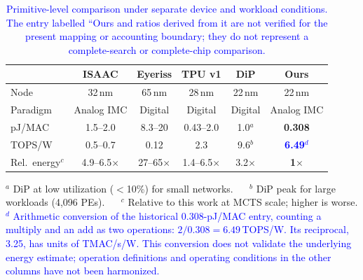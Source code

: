\begin{table}[t]
\centering
\caption{\textcolor{blue}{Primitive-level comparison under separate device and workload conditions. The entry labelled ``Ours\textquotesingle\textquotesingle{} and ratios derived from it are not verified for the present mapping or accounting boundary; they do not represent a complete-search or complete-chip comparison.}}
\label{tab:supp_crossbar_vs_digital}
\setlength{\tabcolsep}{3pt}
\footnotesize
\begin{tabular}{l ccccc}
\toprule
                  & \textbf{ISAAC}\cite{shafiee2016isaac} & \textbf{Eyeriss}\cite{chen2017eyeriss} & \textbf{TPU v1}\cite{jouppi2017tpu} & \textbf{DiP}\cite{abdelmaksoud2025dip} & \textbf{Ours} \\
\midrule
Node              & 32\,nm           & 65\,nm           & 28\,nm          & 22\,nm        & 22\,nm \\
Paradigm          & Analog IMC     & Digital          & Digital         & Digital       & Analog IMC \\
pJ/MAC            & 1.5--2.0         & 8.3--20          & 0.43--2.0       & 1.0$^{a}$     & \textbf{0.308} \\
TOPS/W            & 0.5--0.7         & 0.12             & 2.3             & 9.6$^{b}$     & \textcolor{blue}{\textbf{6.49}$^{d}$} \\
Rel.\ energy$^{c}$ & 4.9--6.5$\times$ & 27--65$\times$ & 1.4--6.5$\times$ & 3.2$\times$ & \textbf{1$\times$} \\
\bottomrule
\end{tabular}
\par\vspace{0.3em}
{\scriptsize $^{a}$ DiP at low utilization ($<$10\%) for small networks. $\quad$ $^{b}$ DiP peak for large workloads (4{,}096 PEs). $\quad$ $^{c}$ Relative to this work at MCTS scale; higher is worse. \textcolor{blue}{$^{d}$ Arithmetic conversion of the historical 0.308-pJ/MAC entry, counting a multiply and an add as two operations: $2/0.308=6.49$\,TOPS/W. Its reciprocal, 3.25, has units of TMAC/s/W. This conversion does not validate the underlying energy estimate; operation definitions and operating conditions in the other columns have not been harmonized.}}
\end{table}
